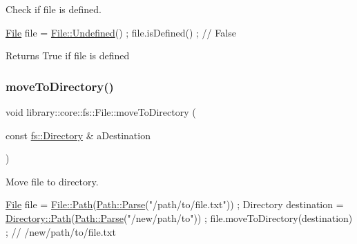 Check if file is defined. 


\begin{DoxyCode}
\hyperlink{classlibrary_1_1core_1_1fs_1_1_file_a6f3f0d79545ac9984c6f49432f0c6c39}{File} file = \hyperlink{classlibrary_1_1core_1_1fs_1_1_file_af45fa5c36c359a979149845ef06586e6}{File::Undefined}() ;
file.isDefined() ; \textcolor{comment}{// False}
\end{DoxyCode}


\begin{DoxyReturn}{Returns}
True if file is defined 
\end{DoxyReturn}
\mbox{\label{classlibrary_1_1core_1_1fs_1_1_file_ac81efdfeb17ea50abe23d96f69bc15ae}} 
\subsubsection{\texorpdfstring{move\+To\+Directory()}{moveToDirectory()}}
{\footnotesize\ttfamily void library\+::core\+::fs\+::\+File\+::move\+To\+Directory (\begin{DoxyParamCaption}\item[{const \hyperlink{classlibrary_1_1core_1_1fs_1_1_directory}{fs\+::\+Directory} \&}]{a\+Destination }\end{DoxyParamCaption})}



Move file to directory. 


\begin{DoxyCode}
\hyperlink{classlibrary_1_1core_1_1fs_1_1_file_a6f3f0d79545ac9984c6f49432f0c6c39}{File} file = \hyperlink{classlibrary_1_1core_1_1fs_1_1_file_a72d6cdf8bb7e299889c6149e2b8a6cc7}{File::Path}(\hyperlink{classlibrary_1_1core_1_1fs_1_1_path_a6ba644b6609507e724c217bf2020f5ae}{Path::Parse}(\textcolor{stringliteral}{"/path/to/file.txt"})) ;
Directory destination = \hyperlink{classlibrary_1_1core_1_1fs_1_1_directory_a6d3ea04654841e62a4dbd99feb563caf}{Directory::Path}(\hyperlink{classlibrary_1_1core_1_1fs_1_1_path_a6ba644b6609507e724c217bf2020f5ae}{Path::Parse}(\textcolor{stringliteral}{"/new/path/to"})) ;
file.moveToDirectory(destination) ; \textcolor{comment}{// /new/path/to/file.txt}
\end{DoxyCode}



